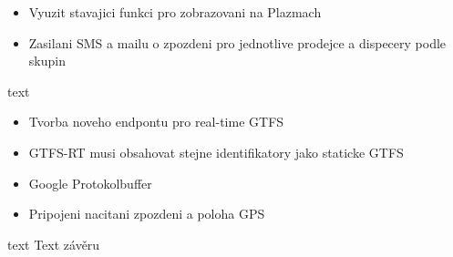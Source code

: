 \begin{itemize}
	\item Vyuzit stavajici funkci pro zobrazovani na Plazmach
	\item Zasilani SMS a mailu o zpozdeni pro jednotlive prodejce a dispecery podle skupin
\end{itemize}

text

\begin{itemize}
	\item Tvorba noveho endpontu pro real-time GTFS
	\item GTFS-RT musi obsahovat stejne identifikatory jako staticke GTFS
	\item Google Protokolbuffer
	\item Pripojeni nacitani zpozdeni a poloha GPS
\end{itemize}

text
Text závěru


